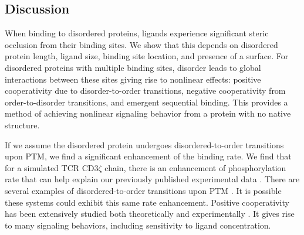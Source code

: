 \documentclass[../../AdvancementSummary.tex]{subfiles}
\begin{document}
\subsection{Discussion}


%




When binding to disordered proteins, ligands experience significant steric occlusion from their binding sites. We show that this depends on disordered protein length, ligand size, binding site location, and presence of a surface.
For disordered proteins with multiple binding sites, disorder leads to global interactions between these sites giving rise to nonlinear effects: positive cooperativity due to disorder-to-order transitions, negative cooperativity from order-to-disorder transitions, and emergent sequential binding. 
This provides a method of achieving nonlinear signaling behavior from a protein with no native structure.	


If we assume the disordered protein undergoes disordered-to-order transitions upon PTM, we find a significant enhancement of the binding rate. 
	We find that for a simulated TCR CD3$\zeta$ chain, there is an enhancement of phosphorylation rate that can help explain our previously published experimental data \cite{Mukhopadhyay2016}.
	There are several examples of disordered-to-order transitions upon PTM \cite{He2015, Bah2015, Chin2016}. It is possible these systems could exhibit this same rate enhancement.
	Positive cooperativity has been extensively studied both theoretically and experimentally \cite{Levantino2012, Monod1965, Jakubik1997, Koshland1966} . It gives rise to many signaling behaviors, including sensitivity to ligand concentration.
\end{document}
